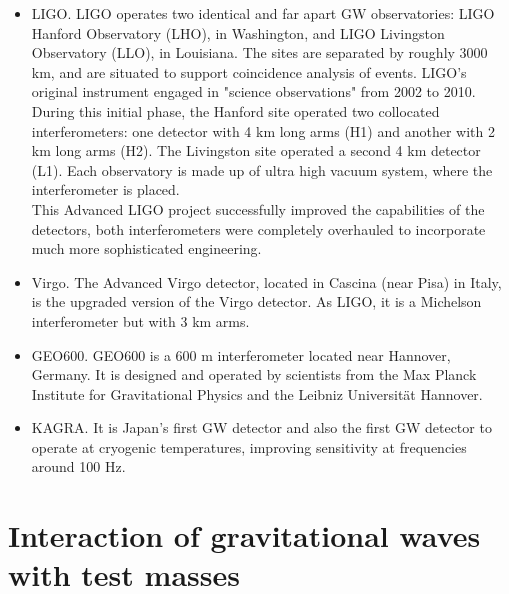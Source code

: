 \documentclass[binding=0.6cm, LaM]{sapthesis}
\begin{document}
	\begin{itemize}
		\item LIGO. LIGO operates two identical and far apart GW observatories: 
			    LIGO Hanford Observatory (LHO), in Washington, and LIGO Livingston Observatory (LLO), in Louisiana.
			    The sites are separated by roughly 3000 km, 
		   	    and are situated to support coincidence analysis of events.
		       	    LIGO's original instrument engaged in "science observations" from 2002 to 2010. 
			    During this initial phase, the Hanford site operated two collocated interferometers:
			    one detector with 4 km long arms (H1) and another with 2 km long arms (H2). 
			    The Livingston site operated a second 4 km detector (L1). 
			    Each observatory is made up of ultra high vacuum system, 
			    where the interferometer is placed. \\
			    This Advanced LIGO project successfully improved the capabilities of the detectors, 
			    both interferometers were completely overhauled to incorporate much more sophisticated engineering.
		\item Virgo. The Advanced Virgo detector, located in Cascina (near Pisa) in Italy, 
			     is the upgraded version of the Virgo detector. 
			     As LIGO, it is a Michelson interferometer but with 3 km arms.
                 \item GEO600. GEO600 is a 600 m interferometer located near Hannover,
                 	       Germany. It is designed and operated by scientists from the
                               Max Planck Institute for Gravitational Physics and the Leibniz Universität Hannover.
                  \item KAGRA. It is Japan’s first GW detector and also the first GW detector to operate
			       at cryogenic temperatures, improving sensitivity at frequencies around 100 Hz.

\end{itemize}

\section{Interaction of gravitational waves with test masses}
	
\end{document}
